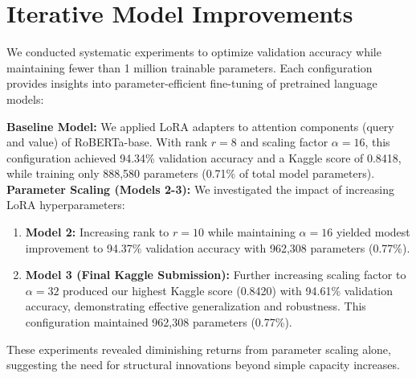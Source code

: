 \documentclass[letterpaper]{article}
\begin{document}
\section{Iterative Model Improvements}

We conducted systematic experiments to optimize validation accuracy while maintaining fewer than 1 million trainable parameters. Each configuration provides insights into parameter-efficient fine-tuning of pretrained language models:

\textbf{Baseline Model:} We applied LoRA adapters to attention components (query and value) of RoBERTa-base. With rank $r=8$ and scaling factor $\alpha=16$, this configuration achieved 94.34\% validation accuracy and a Kaggle score of 0.8418, while training only 888,580 parameters (0.71\% of total model parameters).
\textbf{Parameter Scaling (Models 2-3):} We investigated the impact of increasing LoRA hyperparameters:
\begin{enumerate}
    \item \textbf{Model 2: } Increasing rank to $r=10$ while maintaining $\alpha=16$ yielded modest improvement to 94.37\% validation accuracy with 962,308 parameters (0.77\%).
    
    \item \textbf{Model 3 (Final Kaggle Submission):} Further increasing scaling factor to $\alpha=32$ produced our highest Kaggle score (0.8420) with 94.61\% validation accuracy, demonstrating effective generalization and robustness. This configuration maintained 962,308 parameters (0.77\%).
\end{enumerate}
These experiments revealed diminishing returns from parameter scaling alone, suggesting the need for structural innovations beyond simple capacity increases.
\end{document}
